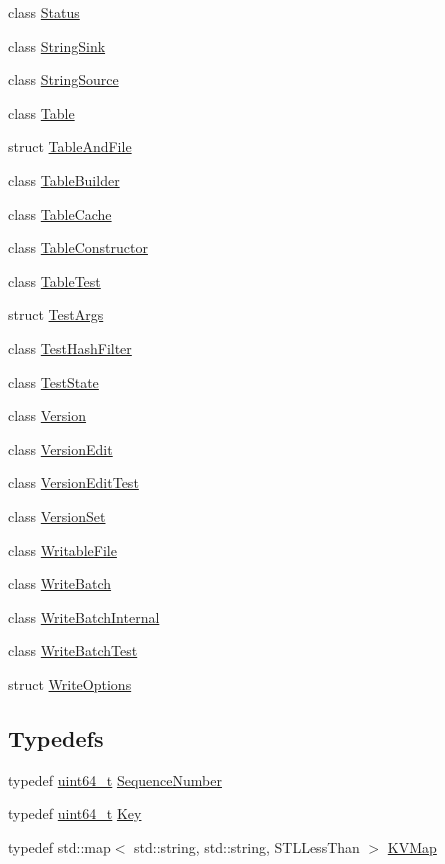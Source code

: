\begin{DoxyCompactItemize}
\item 
class \hyperlink{classleveldb_1_1_status}{Status}
\item 
class \hyperlink{classleveldb_1_1_string_sink}{String\+Sink}
\item 
class \hyperlink{classleveldb_1_1_string_source}{String\+Source}
\item 
class \hyperlink{classleveldb_1_1_table}{Table}
\item 
struct \hyperlink{structleveldb_1_1_table_and_file}{Table\+And\+File}
\item 
class \hyperlink{classleveldb_1_1_table_builder}{Table\+Builder}
\item 
class \hyperlink{classleveldb_1_1_table_cache}{Table\+Cache}
\item 
class \hyperlink{classleveldb_1_1_table_constructor}{Table\+Constructor}
\item 
class \hyperlink{classleveldb_1_1_table_test}{Table\+Test}
\item 
struct \hyperlink{structleveldb_1_1_test_args}{Test\+Args}
\item 
class \hyperlink{classleveldb_1_1_test_hash_filter}{Test\+Hash\+Filter}
\item 
class \hyperlink{classleveldb_1_1_test_state}{Test\+State}
\item 
class \hyperlink{classleveldb_1_1_version}{Version}
\item 
class \hyperlink{classleveldb_1_1_version_edit}{Version\+Edit}
\item 
class \hyperlink{classleveldb_1_1_version_edit_test}{Version\+Edit\+Test}
\item 
class \hyperlink{classleveldb_1_1_version_set}{Version\+Set}
\item 
class \hyperlink{classleveldb_1_1_writable_file}{Writable\+File}
\item 
class \hyperlink{classleveldb_1_1_write_batch}{Write\+Batch}
\item 
class \hyperlink{classleveldb_1_1_write_batch_internal}{Write\+Batch\+Internal}
\item 
class \hyperlink{classleveldb_1_1_write_batch_test}{Write\+Batch\+Test}
\item 
struct \hyperlink{structleveldb_1_1_write_options}{Write\+Options}
\end{DoxyCompactItemize}
\subsection*{Typedefs}
\begin{DoxyCompactItemize}
\item 
typedef \hyperlink{stdint_8h_aaa5d1cd013383c889537491c3cfd9aad}{uint64\+\_\+t} \hyperlink{namespaceleveldb_a5481ededd221c36d652c371249f869fa}{Sequence\+Number}
\item 
typedef \hyperlink{stdint_8h_aaa5d1cd013383c889537491c3cfd9aad}{uint64\+\_\+t} \hyperlink{namespaceleveldb_a7e9a9725b13fa0bd922d885280dfab95}{Key}
\item 
typedef std\+::map$<$ std\+::string, std\+::string, S\+T\+L\+Less\+Than $>$ \hyperlink{namespaceleveldb_aac1e50450147be263e08252c6700f7a7}{K\+V\+Map}
\end{DoxyCompactItemize}
